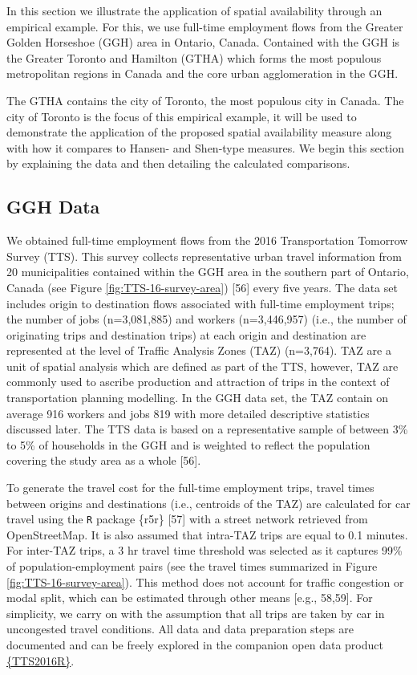 \documentclass[10pt,letterpaper]{article}
\begin{document}
In this section we illustrate the application of spatial availability
through an empirical example. For this, we use full-time employment
flows from the Greater Golden Horseshoe (GGH) area in Ontario, Canada.
Contained with the GGH is the Greater Toronto and Hamilton (GTHA) which
forms the most populous metropolitan regions in Canada and the core
urban agglomeration in the GGH.

The GTHA contains the city of Toronto, the most populous city in Canada.
The city of Toronto is the focus of this empirical example, it will be
used to demonstrate the application of the proposed spatial availability
measure along with how it compares to Hansen- and Shen-type measures. We
begin this section by explaining the data and then detailing the
calculated comparisons.

\hypertarget{ggh-data}{%
\subsection{GGH Data}\label{ggh-data}}

We obtained full-time employment flows from the 2016 Transportation
Tomorrow Survey (TTS). This survey collects representative urban travel
information from 20 municipalities contained within the GGH area in the
southern part of Ontario, Canada (see Figure
\ref{fig:TTS-16-survey-area}) {[}56{]} every five years. The data set
includes origin to destination flows associated with full-time
employment trips; the number of jobs (n=3,081,885) and workers
(n=3,446,957) (i.e., the number of originating trips and destination
trips) at each origin and destination are represented at the level of
Traffic Analysis Zones (TAZ) (n=3,764). TAZ are a unit of spatial
analysis which are defined as part of the TTS, however, TAZ are commonly
used to ascribe production and attraction of trips in the context of
transportation planning modelling. In the GGH data set, the TAZ contain
on average 916 workers and jobs 819 with more detailed descriptive
statistics discussed later. The TTS data is based on a representative
sample of between 3\% to 5\% of households in the GGH and is weighted to
reflect the population covering the study area as a whole {[}56{]}.

To generate the travel cost for the full-time employment trips, travel
times between origins and destinations (i.e., centroids of the TAZ) are
calculated for car travel using the \texttt{R} package \{r5r\} {[}57{]}
with a street network retrieved from OpenStreetMap. It is also assumed
that intra-TAZ trips are equal to 0.1 minutes. For inter-TAZ trips, a 3
hr travel time threshold was selected as it captures 99\% of
population-employment pairs (see the travel times summarized in Figure
\ref{fig:TTS-16-survey-area}). This method does not account for traffic
congestion or modal split, which can be estimated through other means
{[}e.g., 58,59{]}. For simplicity, we carry on with the assumption that
all trips are taken by car in uncongested travel conditions. All data
and data preparation steps are documented and can be freely explored in
the companion open data product
\href{https://soukhova.github.io/TTS2016R/}{\{TTS2016R\}}.
\end{document}
